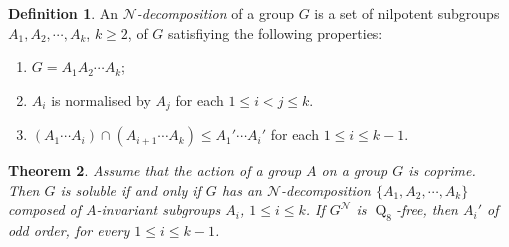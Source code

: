 \documentclass[12pt,a4paper]{article}
\DeclareMathOperator{\Q}{Q}
\newtheorem{theorem}{Theorem}
\theoremstyle{definition}
\newtheorem{definition}[theorem]{Definition}
\begin{document}
\begin{definition}
An \emph{$\mathcal{N}$-decomposition} of a group $G$ is a set of nilpotent subgroups $A_1,A_2,\cdots,A_k$, $k\geq 2$, of $G$ satisfiying the following properties:
\begin{enumerate}
\item $G=A_1A_2\cdots A_k$;
\item $A_i$ is normalised by $A_j$ for each $1\leq i <j\leq k$.
\item $(A_1\cdots A_i) \cap (A_{i+1} \cdots A_k) \leq A_1' \cdots A_i'$ for each $1 \leq i \leq k-1$.
\end{enumerate}
\end{definition}

\begin{theorem}\label{Ndec}
Assume that the action of a group  $A$ on a group $G$ is coprime. Then $G$ is soluble if and only if $G$ has an $\mathcal{N}$-decomposition $\{A_1,A_2,\cdots,A_k\}$  composed of $A$-invariant subgroups $A_i$, $1 \leq i \leq k$. If $G^{\mathcal{N}}$ is $\Q_8$-free, then $A_i'$ of odd order, for every $1 \leq i \leq k-1$.
\end{theorem}
\end{document}
